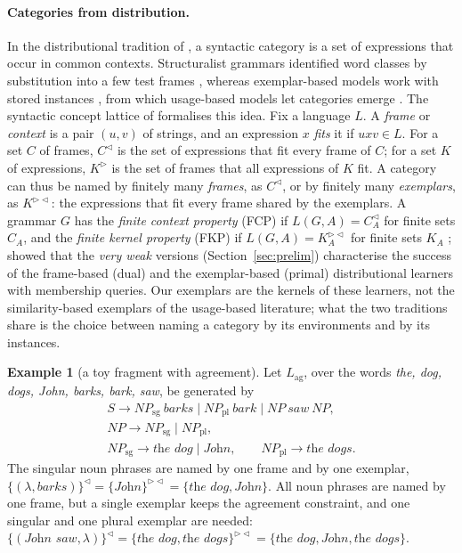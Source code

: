 \documentclass[11pt]{article}
\numberwithin{equation}{section}
\theoremstyle{plain}
\theoremstyle{definition}
\newtheorem{example}[theorem]{Example}
\theoremstyle{remark}
\theoremstyle{plain}
\newcommand{\eps}{\lambda}
\newcommand{\R}{^{\rhd}}
\newcommand{\Lc}{^{\lhd}}
\newcommand{\RL}{^{\rhd\lhd}}
\begin{document}
\paragraph{Categories from distribution.}
In the distributional tradition of \citet{harris1954}, a syntactic
category is a set of expressions that occur in common contexts.
Structuralist grammars identified word classes by substitution into a few
test frames \citep[pp.~74--75]{fries1952}, whereas exemplar-based models work
with stored instances \citep{bod2006}, from which usage-based models let
categories emerge \citep{bybee2006}.  The
syntactic concept lattice of \citet{clark2009fg,clark2010icgi,clark2013}
formalises this idea.  Fix a language $L$.  A \emph{frame} or \emph{context}
is a pair $(u,v)$ of strings, and an expression $x$ \emph{fits} it if
$uxv\in L$.  For a set $C$ of frames, $C\Lc$ is the set of expressions that
fit every frame of $C$; for a set $K$ of expressions, $K\R$ is the set of
frames that all expressions of $K$ fit.  A category can thus be named by
finitely many \emph{frames}, as $C\Lc$, or by finitely many
\emph{exemplars}, as $K\RL$: the expressions that fit every frame shared by
the exemplars.  A grammar $G$ has the \emph{finite context property} (FCP)
if $L(G,A)=C_A\Lc$ for finite sets $C_A$, and the \emph{finite kernel
property} (FKP) if $L(G,A)=K_A\RL$ for finite sets $K_A$
\citep{clark2010icgi,yoshinaka2011dlt,clark-yoshinaka2016}; \citet{ky2017}
showed that the \emph{very weak} versions (Section~\ref{sec:prelim})
characterise the success of the frame-based (dual) and the exemplar-based
(primal) distributional learners with membership queries.  Our exemplars are
the kernels of these learners, not the similarity-based exemplars of the
usage-based literature; what the two traditions share is the choice
between naming a category by its environments and by its instances.

\begin{example}[a toy fragment with agreement]\label{ex:toy}
Let $L_{\mathrm{ag}}$, over the words \emph{the, dog, dogs, John, barks,
bark, saw}, be generated by
\begin{gather*}
S\to NP_{\mathrm{sg}}\ \textit{barks}\mid
NP_{\mathrm{pl}}\ \textit{bark}\mid NP\ \textit{saw}\ NP,\\
NP\to NP_{\mathrm{sg}}\mid NP_{\mathrm{pl}},\\
NP_{\mathrm{sg}}\to\textit{the dog}\mid\textit{John},\qquad
NP_{\mathrm{pl}}\to\textit{the dogs}.
\end{gather*}
The singular noun phrases are named by one frame and by one exemplar,
$\{(\eps,\textit{barks})\}\Lc=\{\textit{John}\}\RL=\{\textit{the dog},\textit{John}\}$.
All noun phrases are named by one frame, but a single exemplar keeps the
agreement constraint, and one singular and one plural exemplar are needed:
$\{(\textit{John saw},\eps)\}\Lc=\{\textit{the dog},\textit{the dogs}\}\RL
=\{\textit{the dog},\textit{John},\textit{the dogs}\}$.
\end{example}
\end{document}
